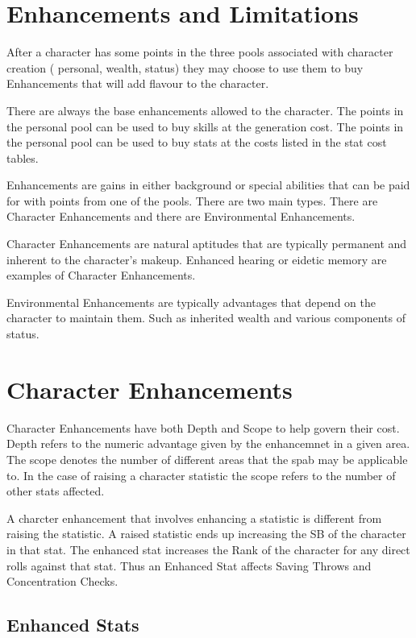 \section{Enhancements and Limitations}

After a character has some points in the three pools associated with
character creation ( personal, wealth, status) they may choose to
use them to buy Enhancements that will add flavour to the character.

There are always the base enhancements allowed to the character. The
points in the personal pool can be used to buy skills at the generation
cost. The points in the personal pool can be used to buy stats at the costs
listed in the stat cost tables.

Enhancements are gains in either background or special abilities that
can be paid for with points from one of the pools. There are two main
types. There are Character Enhancements and there are
Environmental Enhancements.

Character Enhancements are natural aptitudes that are typically 
permanent and inherent to the character's makeup. Enhanced hearing or
eidetic memory are examples of Character Enhancements.

Environmental Enhancements are typically advantages that depend on  the
character to maintain them. Such as inherited wealth and various components 
of status.

\section{Character Enhancements}

Character Enhancements have both Depth and Scope to help govern their cost.
Depth refers to the numeric advantage given by the enhancemnet in a given
area. The scope denotes the number of different areas that the spab
may be applicable to. In the case of raising a character statistic the 
scope refers to the number of other stats affected.

A charcter enhancement that involves enhancing a statistic is different from 
raising the statistic. A raised statistic ends up increasing the SB of the 
character in that stat. The enhanced stat increases the Rank of the 
character for any direct rolls against that stat. Thus an Enhanced Stat
affects Saving Throws and Concentration Checks.

\subsection{Enhanced Stats}
